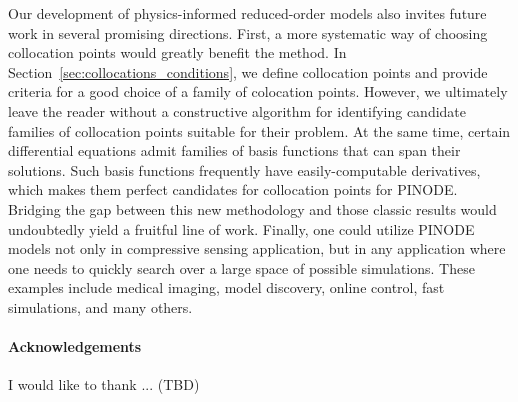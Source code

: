 	Our development of physics-informed reduced-order models also invites future work in several promising directions. First, a more systematic way of choosing collocation points would greatly benefit the method. In Section~\ref{sec:collocations_conditions}, we define collocation points and provide criteria for a good choice of a family of colocation points. However, we ultimately leave the reader without a constructive algorithm for identifying candidate families of collocation points suitable for their problem. At the same time, certain differential equations admit families of basis functions that can span their solutions. Such basis functions frequently have easily-computable derivatives, which makes them perfect candidates for collocation points for PINODE. Bridging the gap between this new methodology and those classic results would undoubtedly yield a fruitful line of work. Finally, one could utilize PINODE models not only in compressive sensing application, but in any application where one needs to quickly search over a large space of possible simulations. These examples include medical imaging, model discovery, online control, fast simulations, and many others.

\paragraph{Acknowledgements} I would like to thank ... (TBD) 